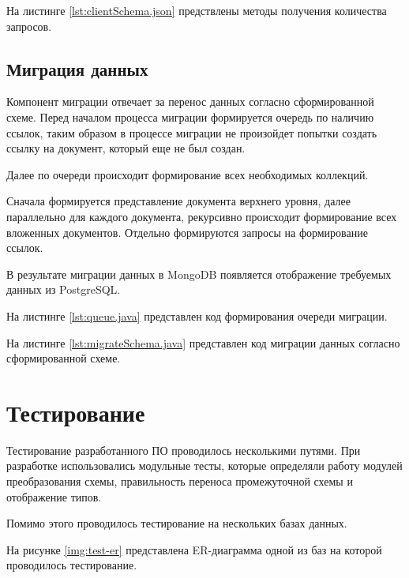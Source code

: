 На листинге \ref{lst:clientSchema.json} предствлены методы получения количества запросов.

\clearpage




\subsection{Миграция данных}
Компонент миграции отвечает за перенос данных согласно сформированной схеме.
Перед началом процесса миграции формируется очередь по наличию ссылок, 
таким образом в процессе миграции не произойдет попытки создать ссылку на документ, 
который еще не был создан.

Далее по очереди происходит формирование всех необходимых коллекций.

Сначала формируется представление документа верхнего уровня, далее параллельно для каждого документа, 
рекурсивно происходит формирование всех вложенных документов. 
Отдельно формируются запросы на формирование ссылок.

В результате миграции данных в MongoDB появляется отображение требуемых данных из PostgreSQL.

На листинге \ref{lst:queue.java} представлен код формирования очереди миграции.

\clearpage

На листинге \ref{lst:migrateSchema.java} представлен код миграции данных согласно сформированной схеме.

\clearpage
\section{Тестирование}
Тестирование разработанного ПО проводилось несколькими путями. 
При разработке использовались модульные тесты, 
которые определяли работу модулей преобразования схемы, правильность переноса промежуточной схемы и отображение типов.

Помимо этого проводилось тестирование на нескольких базах данных.

На рисунке \ref{img:test-er} представлена ER-диаграмма одной из баз на которой проводилось тестирование.


\clearpage


